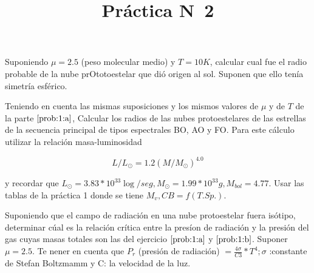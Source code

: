 \documentclass[12pt,a4paper]{practice}
\begin{document}
    \title{Práctica N\textdegree\ 2}
    \maketitle
     \begin{problem}\label{prob:1}

        \begin{ppart}\label{prob:1:a}
        Suponiendo $\mu = 2.5$ (peso molecular medio) y $T = 10 K$,
        calcular cual fue el radio probable de la nube prOtotoestelar que dió origen al sol. Suponen que ello tenía simetría esférico.
        \end{ppart}

        \begin{ppart}\label{prob:1:b}
        Teniendo en cuenta las mismas suposiciones y los mismos valores de $\mu$ y de $T$ de la parte $\ref{prob:1:a}$, Calcular los radios de las nubes protoestelares de las estrellas de la secuencia principal de tipos espectrales BO, AO y FO. Para este cálculo utilizar la relación masa-luminosidad

        $$
            L/L_{\odot} = 1.2(M/M_{\odot})^{4.0}
        $$

        y recordar que $L_{\odot} = 3.83 * 10^{33} \log /seg, M_{\odot} = 1.99*10^{33} g, M_{bol} = 4.77$. Usar las tablas de la práctica 1 donde se tiene $M_{v},CB=f(T.Sp.)$.
        \end{ppart}
    \end{problem}

    \begin{problem}\label{prob:2}
    Suponiendo que el campo de radiación en una nube protoestelar fuera isótipo, determinar cúal es la relación crítica entre la presíon de radiación y la presión del gas cuyas masas totales son las del ejercicio $\ref{prob:1:a}$ y $\ref{prob:1:b}$. Suponer $\mu =2.5$. Te nener en cuenta que $P_{r}$ (presión de radiación) $ = \frac{4\sigma}{C3}*T^{4}; \sigma$ :constante de Stefan Boltzmamm y C: la velocidad de la luz.
    \end{problem}
\end{document}
